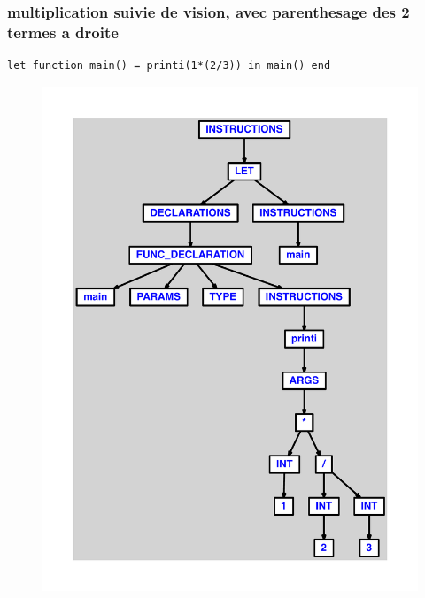 \documentclass{article}
\begin{document}
\subsubsection{multiplication suivie de vision, avec parenthesage des 2 termes a droite}
\begin{lstlisting}
let function main() = printi(1*(2/3)) in main() end
\end{lstlisting}
\newpage
\begin{figure}[H]
\centering
\includegraphics[max width=\textwidth]{ast/ast_94.pdf}
\end{figure}
\newpage
\end{document}
